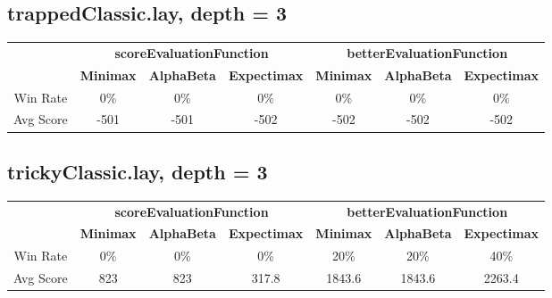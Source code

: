 \documentclass[english, a4paper,12pt]{article}
\begin{document}
\subsection*{trappedClassic.lay, depth = 3}
\small\begin{tabular}{|c|c|c|c|c|c|c|}
\hline
\text{ } & \multicolumn{3}{c|}{\textbf{scoreEvaluationFunction}} & \multicolumn{3}{c|}{\textbf{betterEvaluationFunction}} \\
\cline{2-7}
& \textbf{Minimax} & \textbf{AlphaBeta} & \textbf{Expectimax} & \textbf{Minimax} & \textbf{AlphaBeta} & \textbf{Expectimax} \\
\hline
Win Rate & 0\% & 0\% & 0\% & 0\% & 0\% & 0\%\\
Avg Score & -501 & -501 & -502 & -502 & -502 & -502\\ 
\hline
\end{tabular}

\subsection*{trickyClassic.lay, depth = 3}
\small\begin{tabular}{|c|c|c|c|c|c|c|}
\hline
\text{ } & \multicolumn{3}{c|}{\textbf{scoreEvaluationFunction}} & \multicolumn{3}{c|}{\textbf{betterEvaluationFunction}} \\
\cline{2-7}
& \textbf{Minimax} & \textbf{AlphaBeta} & \textbf{Expectimax} & \textbf{Minimax} & \textbf{AlphaBeta} & \textbf{Expectimax} \\
\hline
Win Rate & 0\% & 0\% & 0\% & 20\% & 20\% & 40\%\\
Avg Score & 823 & 823 & 317.8 & 1843.6 & 1843.6 & 2263.4\\ 
\hline
\end{tabular}
\end{document}
